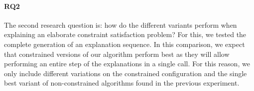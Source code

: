 {%


\paragraph{RQ2}
The second research question is: how do the different variants perform when explaining an elaborate constraint satisfaction problem? For this, we tested the complete generation of an explanation sequence. 
In this comparison, we expect that constrained versions of our algorithm perform best as they will allow performing an entire step of the explanations in a single call.
For this reason, we only include different variations on the constrained configuration and the single best variant of non-constrained algorithms found in the previous experiment. 

}
